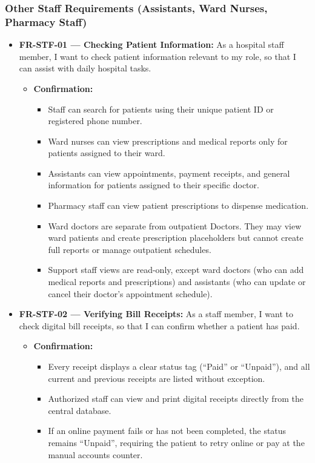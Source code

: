 \documentclass[11pt,a4paper]{article}
\begin{document}
\subsubsection{Other Staff Requirements (Assistants, Ward Nurses, Pharmacy Staff)}

\begin{itemize}
    \item \textbf{FR-STF-01 — Checking Patient Information:} As a hospital staff member, I want to check patient information relevant to my role, so that I can assist with daily hospital tasks.
    \begin{itemize}
        \item \textbf{Confirmation:}
        \begin{itemize}
            \item Staff can search for patients using their unique patient ID or registered phone number.
            \item Ward nurses can view prescriptions and medical reports only for patients assigned to their ward.
            \item Assistants can view appointments, payment receipts, and general information for patients assigned to their specific doctor.
            \item Pharmacy staff can view patient prescriptions to dispense medication.
            \item Ward doctors are separate from outpatient Doctors. They may view ward patients and create prescription placeholders but cannot create full reports or manage outpatient schedules.
            \item Support staff views are read-only, except ward doctors (who can add medical reports and prescriptions) and assistants (who can update or cancel their doctor's appointment schedule).
        \end{itemize}
    \end{itemize}

    \item \textbf{FR-STF-02 — Verifying Bill Receipts:} As a staff member, I want to check digital bill receipts, so that I can confirm whether a patient has paid.
    \begin{itemize}
        \item \textbf{Confirmation:}
        \begin{itemize}
            \item Every receipt displays a clear status tag (``Paid'' or ``Unpaid''), and all current and previous receipts are listed without exception.
            \item Authorized staff can view and print digital receipts directly from the central database.
            \item If an online payment fails or has not been completed, the status remains ``Unpaid'', requiring the patient to retry online or pay at the manual accounts counter.
        \end{itemize}
    \end{itemize}


\end{itemize}
\end{document}
